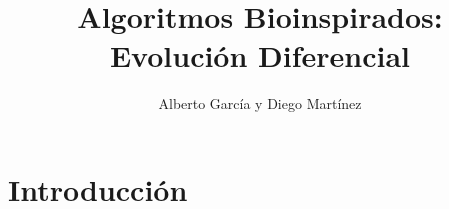 \documentclass{article}
\title{Algoritmos Bioinspirados: Evolución Diferencial}
\author{Alberto García y Diego Martínez}
\begin{document}
\maketitle
\section{Introducción}
\end{document}
